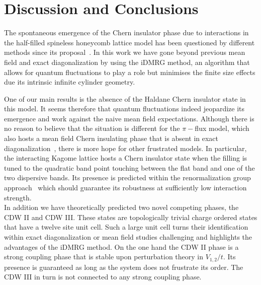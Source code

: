 \documentclass[aps,prx,10pt,twocolumn,floatfix,superscriptaddress,showpacs,numerical,footinbib]{revtex4-1}
\begin{document}
\section{\label{sec:discconc}Discussion and Conclusions}
%

The spontaneous emergence of the Chern insulator phase due to interactions in the half-filled spineless honeycomb lattice
model has been questioned by different methods since its proposal~\cite{RQHZ08,WF10,GCC13,GGNVC13,DH14,DCH14}.
%
In this work we have gone beyond previous mean field and exact diagonalization by using the iDMRG method, an algorithm that allows for quantum fluctuations
to play a role but minimises the finite size effects due its intrinsic infinite cylinder geometry.

One of our main results is the absence of the Haldane Chern insulator state in this model.
%
It seems therefore that quantum fluctuations indeed jeopardize its emergence and work against
the naive mean field expectations.
%
Although there is no reason to believe that the situation is different for the $\pi-$flux model, which also hosts a
mean field Chern insulating phase that is absent in exact diagonalization~\cite{WF10,JGC13}, 
there is more hope for other frustrated models.
%
In particular, the interacting Kagome lattice hosts a Chern insulator state when the filling is tuned to
the quadratic band point touching between the flat band and one of the two dispersive bands.
%
Its presence is predicted within the renormalization group approach~\cite{SF08,SYF09} which should guarantee
its robustness at sufficiently low interaction strength.\\
%
In addition we have theoretically predicted two novel competing phases, the CDW II and CDW III.
%
These states are topologically trivial charge ordered states that have a twelve site unit cell.
%
Such a large unit cell turns their identification within exact diagonalization or mean field studies 
challenging and highlights the advantages of the iDMRG method.
%
On the one hand the CDW II phase is a strong coupling phase that is stable upon perturbation theory in $V_{1,2}/t$.
%
Its presence is guaranteed as long as the system does not frustrate its order. 
%
The CDW III in turn is not connected to any strong coupling phase.
\end{document}
